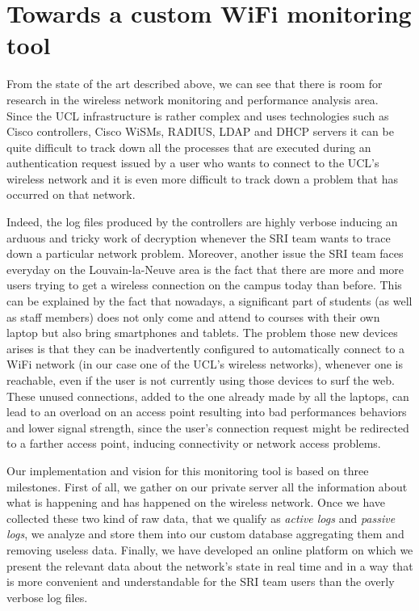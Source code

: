 \section{Towards a custom WiFi monitoring tool}
From the state of the art described above, we can see that there is room for research in the wireless network monitoring and performance analysis area.\\
Since the UCL infrastructure is rather complex and uses technologies such as Cisco controllers, Cisco WiSMs, RADIUS, LDAP and DHCP servers it can be quite difficult to track down all the processes that are executed during an authentication request issued by a user who wants to connect to the UCL's wireless network and it is even more difficult to track down a problem that has occurred on that network.

Indeed, the log files produced by the controllers are highly verbose inducing an arduous and tricky work of decryption whenever the SRI team wants to trace down a particular network problem. Moreover, another issue the SRI team faces everyday on the Louvain-la-Neuve area is the fact that there are more and more users trying to get a wireless connection on the campus today than before. This can be explained by the fact that nowadays, a significant part of students (as well as staff members) does not only come and attend to courses with their own laptop but also bring smartphones and tablets. The problem those new devices arises is that they can be inadvertently configured to automatically connect to a WiFi network (in our case one of the UCL's wireless networks), whenever one is reachable, even if the user is not currently using those devices to surf the web. These unused connections, added to the one already made by all the laptops, can lead to an overload on an access point resulting into bad performances behaviors and lower signal strength, since the user's connection request might be redirected to a farther access point, inducing connectivity or network access problems.


Our implementation and vision for this monitoring tool is based on three milestones. First of all, we gather on our private server all the information about what is happening and has happened on the wireless network. Once we have collected these two kind of raw data, that we qualify as \textit{active logs} and \textit{passive logs}, we analyze and store them into our custom database aggregating them and removing useless data. Finally, we have developed an online platform on which we present the relevant data about the network's state in real time and in a way that is more convenient and understandable for the SRI team users than the overly verbose log files.

